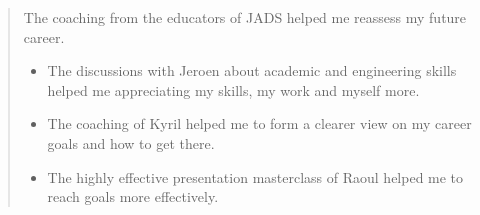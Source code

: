 \documentclass[letterpaper,10pt,english]{sphinxmanual}
\begin{document}
\begin{itemize}
\begin{quote}
The coaching from the educators of JADS helped me reassess my future career.
\begin{itemize}
\item {} 
The discussions with Jeroen about academic and engineering skills helped me appreciating my skills, my work and myself more.

\item {} 
The coaching of Kyril helped me to form a clearer view on my career goals and how to get there.

\item {} 
The highly effective presentation masterclass of Raoul helped me to reach goals more effectively.

\end{itemize}
\end{quote}

\end{itemize}
\end{document}

